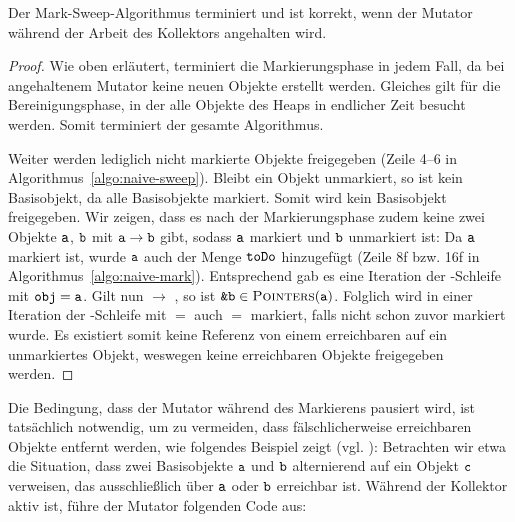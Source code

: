 \begin{mybox}
\begin{satz}
	\label{satz:mark-sweep-correctness}
	Der Mark-Sweep-Algorithmus terminiert und ist korrekt, wenn der Mutator während der Arbeit des Kollektors angehalten wird.
\end{satz}
\end{mybox}

\begin{proof}
	Wie oben erläutert, terminiert die Markierungsphase in jedem Fall, da bei angehaltenem Mutator keine neuen Objekte erstellt werden.
	Gleiches gilt für die Bereinigungsphase, in der alle Objekte des Heaps in endlicher Zeit besucht werden.
	Somit terminiert der gesamte Algorithmus.
	
	Weiter werden lediglich nicht markierte Objekte freigegeben (Zeile 4--6 in Algorithmus~\ref{algo:naive-sweep}).
	Bleibt ein Objekt  unmarkiert, so ist  kein Basisobjekt, da  alle Basisobjekte markiert.
	Somit wird kein Basisobjekt freigegeben.
	Wir zeigen, dass es nach der Markierungsphase zudem keine zwei Objekte $\texttt{a}$, $\texttt{b}$ mit $\texttt{a} \rightarrow \texttt{b}$ gibt, sodass $\texttt{a}$ markiert und $\texttt{b}$ unmarkiert ist:
	Da $\texttt{a}$ markiert ist, wurde $\texttt{a}$ auch der Menge $\texttt{toDo}$ hinzugefügt (Zeile 8f bzw. 16f in Algorithmus~\ref{algo:naive-mark}).
	Entsprechend gab es eine Iteration der \WHILE-Schleife mit $\texttt{obj} = \texttt{a}$.
	Gilt nun  $\rightarrow$ , so ist $\texttt{\&b} \in \textsc{Pointers}(\texttt{a})$.
	Folglich wird in einer Iteration der \FOREACH-Schleife mit  $=$  auch  $=$  markiert, falls  nicht schon zuvor markiert wurde.
	Es existiert somit keine Referenz von einem erreichbaren auf ein unmarkiertes Objekt, weswegen keine erreichbaren Objekte freigegeben werden.
\end{proof}

Die Bedingung, dass der Mutator während des Markierens pausiert wird, ist tatsächlich notwendig, um zu vermeiden, dass fälschlicherweise erreichbaren Objekte entfernt werden, wie folgendes Beispiel zeigt (vgl. \cite[969]{dijkstra1978}):
Betrachten wir etwa die Situation, dass zwei Basisobjekte $\texttt{a}$ und $\texttt{b}$ alternierend auf ein Objekt $\texttt{c}$ verweisen, das ausschließlich über $\texttt{a}$ oder $\texttt{b}$ erreichbar ist.
Während der Kollektor aktiv ist, führe der Mutator folgenden Code aus:

